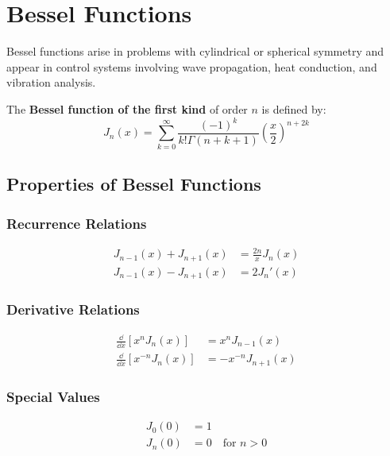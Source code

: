 \section{Bessel Functions}

Bessel functions arise in problems with cylindrical or spherical symmetry and appear in control systems involving wave propagation, heat conduction, and vibration analysis.

\begin{definitionbox}[title=Definition 10.8: Bessel Functions of the First Kind]
The \textbf{Bessel function of the first kind} of order $n$ is defined by:
\begin{equation}
J_n(x) = \sum_{k=0}^{\infty} \frac{(-1)^k}{k!\Gamma(n+k+1)}\left(\frac{x}{2}\right)^{n+2k}
\end{equation}
\end{definitionbox}



\subsection{Properties of Bessel Functions}

\subsubsection{Recurrence Relations}
\begin{align}
J_{n-1}(x) + J_{n+1}(x) &= \frac{2n}{x}J_n(x) \\
J_{n-1}(x) - J_{n+1}(x) &= 2J_n'(x)
\end{align}

\subsubsection{Derivative Relations}
\begin{align}
\frac{\dd}{\dd x}[x^n J_n(x)] &= x^n J_{n-1}(x) \\
\frac{\dd}{\dd x}[x^{-n} J_n(x)] &= -x^{-n} J_{n+1}(x)
\end{align}

\subsubsection{Special Values}
\begin{align}
J_0(0) &= 1 \\
J_n(0) &= 0 \quad \text{for } n > 0
\end{align}

